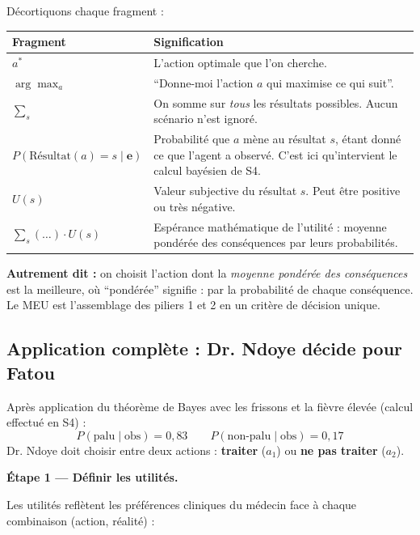 \documentclass[11pt,a4paper]{article}
\begin{document}
Décortiquons chaque fragment :

\begin{center}
\renewcommand{\arraystretch}{1.5}
\begin{tabular}{>{\ttfamily}lp{10.5cm}}
\toprule
\textbf{Fragment} & \textbf{Signification} \\
\midrule
$a^*$ & L'action optimale que l'on cherche. \\
$\arg\max_a$ & ``Donne-moi l'action $a$ qui maximise ce qui suit''. \\
$\sum_s$ & On somme sur \textit{tous} les résultats possibles. Aucun scénario n'est ignoré. \\
$P(\mathrm{Résultat}(a)=s \mid \mathbf{e})$ & Probabilité que $a$ mène au résultat $s$, étant donné ce que l'agent a observé. C'est ici qu'intervient le calcul bayésien de S4. \\
$U(s)$ & Valeur subjective du résultat $s$. Peut être positive ou très négative. \\
$\sum_s (\ldots) \cdot U(s)$ & Espérance mathématique de l'utilité : moyenne pondérée des conséquences par leurs probabilités. \\
\bottomrule
\end{tabular}
\end{center}

\textbf{Autrement dit :} on choisit l'action dont la \textit{moyenne pondérée des conséquences} est la meilleure, où ``pondérée'' signifie : par la probabilité de chaque conséquence. Le MEU est l'assemblage des piliers 1 et 2 en un critère de décision unique.

\subsection{Application complète : Dr. Ndoye décide pour Fatou}

\begin{exemplebox}
Après application du théorème de Bayes avec les frissons et la fièvre élevée (calcul effectué en S4) :
$$P(\text{palu} \mid \text{obs}) = 0{,}83 \qquad P(\text{non-palu} \mid \text{obs}) = 0{,}17$$
Dr. Ndoye doit choisir entre deux actions : \textbf{traiter} ($a_1$) ou \textbf{ne pas traiter} ($a_2$).
\end{exemplebox}

\medskip
\textbf{Étape 1 --- Définir les utilités.}

Les utilités reflètent les préférences cliniques du médecin face à chaque combinaison (action, réalité) :
\end{document}
